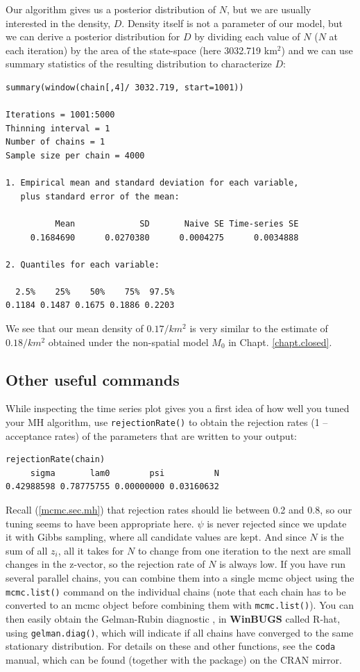 Our algorithm gives us a posterior distribution of $N$, but we are usually 
interested in the density, $D$. Density itself is not a parameter of our 
model, but we can derive a posterior distribution for $D$ by dividing 
each value of $N$ ($N$ at each iteration) by the area of the state-space
 (here 3032.719 km$^2$) and we can use summary statistics of the 
 resulting distribution to characterize $D$:
\begin{verbatim}
summary(window(chain[,4]/ 3032.719, start=1001))

Iterations = 1001:5000
Thinning interval = 1 
Number of chains = 1 
Sample size per chain = 4000 

1. Empirical mean and standard deviation for each variable,
   plus standard error of the mean:

          Mean             SD       Naive SE Time-series SE 
     0.1684690      0.0270380      0.0004275      0.0034888 

2. Quantiles for each variable:

  2.5%    25%    50%    75%  97.5% 
0.1184 0.1487 0.1675 0.1886 0.2203 
\end{verbatim}
We see that our mean density of $0.17/km^2$ is very similar to the estimate of $0.18/km^2$ obtained under the non-spatial model $M_0$ in Chapt. \ref{chapt.closed}.


\subsection{Other useful commands }
While inspecting the time series plot gives you a first idea of how well you tuned your MH algorithm, use \verb#rejectionRate()# to obtain the rejection rates (1 -- acceptance rates) of the parameters that are written to your output:
\begin{verbatim}
rejectionRate(chain)
     sigma       lam0        psi          N 
0.42988598 0.78775755 0.00000000 0.03160632 
\end{verbatim}
 Recall (\ref{mcmc.sec.mh}) that rejection rates should lie between 0.2 and 0.8, so our tuning seems to have been appropriate here. $\psi$ is never rejected since we update it with Gibbs sampling, where all candidate values are kept. And since $N$ is the sum of all $z_i$, all it takes for $N$ to change from one iteration to the next are small changes in the z-vector, so the rejection rate of $N$ is always low.
If you have run several parallel chains, you can combine them into a single mcmc object using the \verb#mcmc.list()# command on the individual chains (note that each chain has to be converted to an mcmc object before combining them with \verb#mcmc.list()#). You can then easily obtain the Gelman-Rubin diagnostic \citep{gelman_etal:2004}, in {\bf WinBUGS} called R-hat, using \verb#gelman.diag()#, which 
will indicate if all chains have converged to the same stationary distribution.
For details on these and other functions, see the \mbox{\tt coda} manual, 
which can be found (together with the package) on the CRAN mirror.

